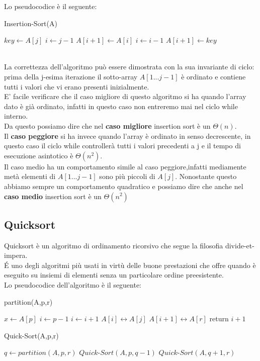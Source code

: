 \documentclass[]{article}
\begin{document}
Lo pseudocodice è il seguente:\\
\begin{algorithm}
\caption{Insertion-Sort(A)}
\begin{algorithmic}[1]
	\STATE $key \leftarrow A[j]$
	\STATE $i \leftarrow j - 1$
		\STATE	$A[i+1] \leftarrow A[i]$
		\STATE $ i \leftarrow i - 1$
	\ENDWHILE
	\STATE $ A[i+1] \leftarrow key$
\ENDFOR 
\end{algorithmic}
\end{algorithm}
\\
La correttezza dell'algoritmo può essere dimostrata con la sua invariante di ciclo:\\ prima della j-esima iterazione il sotto-array $A[1 ... j-1]$ è ordinato e contiene tutti i valori che vi erano presenti inizialmente.\\
E' facile verificare che il caso migliore di questo algoritmo si ha quando l'array dato è già ordinato, infatti in questo caso non entreremo mai nel ciclo while interno.\\
Da questo possiamo dire che nel \textbf{caso migliore} insertion sort è un $\Theta(n)$.\\
Il \textbf{caso peggiore} si ha invece quando l'array è ordinato in senso decrescente, in questo caso il ciclo while controllerà tutti i valori precedenti a j e il tempo di esecuzione asintotico è $\Theta(n^2)$.\\
Il caso medio ha un comportamento simile al caso peggiore,infatti mediamente metà elementi di $A[1 ... j-1]$ sono più piccoli di $A[j]$. Nonostante questo abbiamo sempre un comportamento quadratico e possiamo dire che anche nel \textbf{caso medio} insertion sort è un $\Theta(n^2)$
\subsection{Quicksort}
Quicksort è un algoritmo di ordinamento ricorsivo che segue la filosofia divide-et-impera.\\
\'E uno degli algoritmi più usati in virtù delle buone prestazioni che offre quando è eseguito su insiemi di elementi senza un particolare ordine preesistente.\\
Lo pseudocodice dell'algoritmo è il seguente:

\begin{algorithm}
\caption{partition(A,p,r)}
\begin{algorithmic}[1]
\STATE $x \leftarrow A[p]$
\STATE $i \leftarrow p-1$
		\STATE $i \leftarrow i + 1$
		\STATE $A[i] \leftrightarrow A[j]$
	\ENDIF
\ENDFOR
\STATE $A[i+1] \leftrightarrow A[r]$
\STATE return $i+1$
\end{algorithmic}
\end{algorithm}
\newpage
\begin{algorithm}
\caption{Quick-Sort(A,p,r)}
\begin{algorithmic}[1]
	\STATE $q \leftarrow partition(A,p,r)$
	\STATE $Quick\mbox{-}Sort(A,p,q-1)$
	\STATE $Quick\mbox{-}Sort(A,q+1,r)$
\ENDIF
\end{algorithmic}
\end{algorithm}
\end{document}
